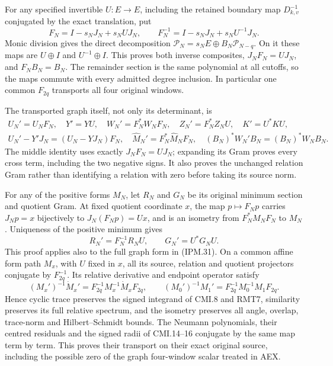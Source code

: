 \documentclass[11pt,a4paper]{article}
\theoremstyle{definition}
\begin{document}
For any specified invertible \(U:E\to E\), including the retained
boundary map \(D_{k,v}^{-1}\) conjugated by the exact translation,
put
\[
 F_N=I-s_NJ_N+s_NUJ_N,\qquad
 F_N^{-1}=I-s_NJ_N+s_NU^{-1}J_N.
 \tag{IPM.32}
\]
Monic division gives the direct decomposition
\(\mathcal P_N=s_NE\oplus B_N\mathcal P_{N-q}\). On it these
maps are \(U\oplus I\) and \(U^{-1}\oplus I\). This proves both
inverse composites, \(J_NF_N=UJ_N\), and \(F_NB_N=B_N\).
The remainder section is the same polynomial at all cutoffs, so the
maps commute with every admitted degree inclusion. In particular one
common \(F_{2q}\) transports all four original windows.

The transported graph itself, not only its determinant, is
\[
 \begin{gathered}
 U_N'=U_NF_N,\quad Y'=YU,\quad
 W_N'=F_N^*W_NF_N,\quad Z_N'=F_N^*Z_NU,\quad K'=U^*KU,\\
 U_N'-Y'J_N=(U_N-YJ_N)F_N,\quad
 \widehat M_N'=F_N^*\widehat M_NF_N,
 \quad (B_N)^*W_N'B_N=(B_N)^*W_NB_N.
 \end{gathered}
 \tag{IPM.33}
\]
The middle identity uses exactly \(J_NF_N=UJ_N\); expanding its
Gram proves every cross term, including the two negative signs.
It also proves the unchanged relation Gram rather than identifying a
relation with zero before taking its source norm.

For any of the positive forms \(M_N\), let \(R_N\) and \(G_N\)
be its original minimum section and quotient Gram. At fixed quotient
coordinate \(x\), the map \(p\mapsto F_Np\) carries \(J_Np=x\)
bijectively to \(J_N(F_Np)=Ux\), and is an isometry from
\(F_N^*M_NF_N\) to \(M_N\). Uniqueness of the positive minimum gives
\[
 R_N'=F_N^{-1}R_NU,\qquad G_N'=U^*G_NU.
 \tag{IPM.34}
\]
This proof applies also to the full graph form in (IPM.31). On a common
affine form path \(M_x\), with \(U\) fixed in \(x\), all its
source, relation and quotient projectors conjugate by \(F_{2q}^{-1}\).
Its relative derivative and endpoint operator satisfy
\[
 (M_x')^{-1}\dot M_x'=F_{2q}^{-1}M_x^{-1}\dot M_xF_{2q},\qquad
 (M_0')^{-1}M_1'=F_{2q}^{-1}M_0^{-1}M_1F_{2q}.
 \tag{IPM.35}
\]
Hence cyclic trace preserves the signed integrand of CMI.8 and RMT7,
similarity preserves its full relative spectrum, and the isometry
preserves all angle, overlap, trace-norm and Hilbert--Schmidt bounds.
The Neumann polynomials, their centred residuals and the signed radii
of CMI.14--16 conjugate by the same map term by term. This proves their
transport on their exact original source, including the possible zero
of the graph four-window scalar treated in AEX.
\end{document}
